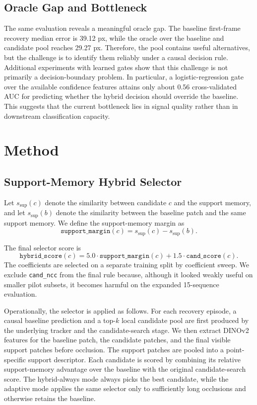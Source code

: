 \documentclass[10pt,journal,compsoc]{IEEEtran}
\newcommand{\supportmargin}{\texttt{support\_margin}}
\newcommand{\candscore}{\texttt{cand\_score}}
\begin{document}
\subsection{Oracle Gap and Bottleneck}

The same evaluation reveals a meaningful oracle gap. The baseline first-frame recovery median error is 39.12 px, while the oracle over the baseline and candidate pool reaches 29.27 px. Therefore, the pool contains useful alternatives, but the challenge is to identify them reliably under a causal decision rule. Additional experiments with learned gates show that this challenge is not primarily a decision-boundary problem. In particular, a logistic-regression gate over the available confidence features attains only about 0.56 cross-validated AUC for predicting whether the hybrid decision should override the baseline. This suggests that the current bottleneck lies in signal quality rather than in downstream classification capacity.

\section{Method}
\label{sec:method}

\subsection{Support-Memory Hybrid Selector}

Let $s_{\text{sup}}(c)$ denote the similarity between candidate $c$ and the support memory, and let $s_{\text{sup}}(b)$ denote the similarity between the baseline patch and the same support memory. We define the support-memory margin as
\begin{equation}
\supportmargin(c) = s_{\text{sup}}(c) - s_{\text{sup}}(b).
\end{equation}

The final selector score is
\begin{equation}
\texttt{hybrid\_score}(c) = 5.0 \cdot \supportmargin(c) + 1.5 \cdot \candscore(c).
\end{equation}
The coefficients are selected on a separate training split by coefficient sweep. We exclude \texttt{cand\_ncc} from the final rule because, although it looked weakly useful on smaller pilot subsets, it becomes harmful on the expanded 15-sequence evaluation.

Operationally, the selector is applied as follows. For each recovery episode, a causal baseline prediction and a top-$k$ local candidate pool are first produced by the underlying tracker and the candidate-search stage. We then extract DINOv2 features for the baseline patch, the candidate patches, and the final visible support patches before occlusion. The support patches are pooled into a point-specific support descriptor. Each candidate is scored by combining its relative support-memory advantage over the baseline with the original candidate-search score. The hybrid-always mode always picks the best candidate, while the adaptive mode applies the same selector only to sufficiently long occlusions and otherwise retains the baseline.
\end{document}
